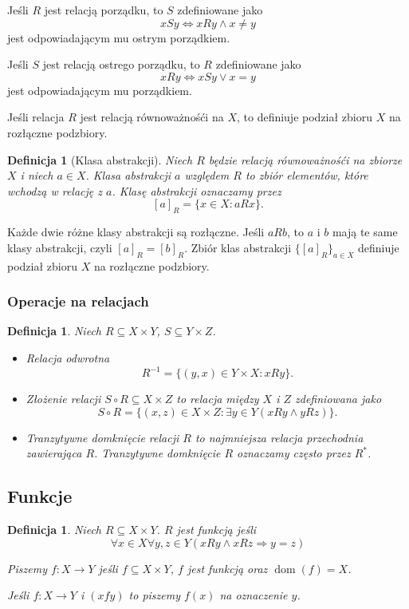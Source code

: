 \documentclass[12pt]{article}
\newcommand{\isfunc}[3]{{{#1}\colon{#2}\rightarrow{#3}}}
\newcommand{\imp}{\Rightarrow}
\newtheorem{dfn}[thm]{Definicja}
\DeclareMathOperator{\dom}{dom}
\begin{document}
	Jeśli $R$ jest relacją porządku, to $S$ zdefiniowane jako 
\[ xSy \iff xRy \land x\not= y\]
jest odpowiadającym mu ostrym porządkiem.

Jeśli $S$ jest relacją ostrego porządku, to $R$ zdefiniowane jako 
\[ xRy \iff xSy \lor x= y\]
jest odpowiadającym mu porządkiem.


	Jeśli relacja $R$ jest relacją równoważnośći na $X$, to definiuje 
podział zbioru $X$ na rozłączne podzbiory.

\begin{dfn}[Klasa abstrakcji]
Niech $R$ będzie relacją równoważnośći na zbiorze $X$ i niech $a\in X$.
Klasa abstrakcji $a$ względem $R$ to zbiór elementów, które wchodzą 
w relację z $a$. Klasę abstrakcji oznaczamy przez
\[ 
[a]_R = \{ x\in X\colon aRx\}.
\]
\end{dfn}
Każde dwie różne klasy abstrakcji są rozłączne. 
Jeśli $aRb$, to $a$ i $b$ mają te same klasy abstrakcji, 
czyli $[a]_R=[b]_R$.
Zbiór klas abstrakcji $\{ [a]_R \}_{a\in X}$ definiuje podział zbioru $X$
na rozłączne podzbiory. 


\subsubsection{Operacje na relacjach}

\begin{dfn}
	Niech $R\subseteq X\times Y$, $S\subseteq Y\times Z$. 
	\begin{itemize}
		\item Relacja odwrotna 
		 \[R^{-1} = \{ (y,x)\in Y\times X\colon xRy \}.\]
		\item Złożenie relacji $S\circ R\subseteq X\times Z$ 
		to relacja między $X$ i $Z$ zdefiniowana jako 
		\[ 
		S\circ R = \{ (x,z)\in X\times Z\colon \exists y\in Y(xRy \land yRz)\}.
		\]
		\item Tranzytywne domknięcie relacji $R$ to najmniejsza relacja przechodnia zawierająca $R$. Tranzytywne domknięcie $R$ oznaczamy często 
		przez $R^*$.
	\end{itemize}
\end{dfn}

	
\subsection{Funkcje}

\begin{dfn}
	Niech $R\subseteq X\times Y$. 
	$R$ jest funkcją jeśli 
	\[
	 \forall x\in X \forall y,z \in Y(xRy\land xRz \imp y=z)
	\]
	
	Piszemy $f\colon X\rightarrow Y$ jeśli $f\subseteq X\times Y$, $f$ jest funkcją oraz $\dom(f) = X$.
	
	Jeśli $\isfunc{f}{X}{Y}$ i $(xfy)$ to piszemy $f(x)$ na oznaczenie 
	$y$. 
\end{dfn}
\end{document}
